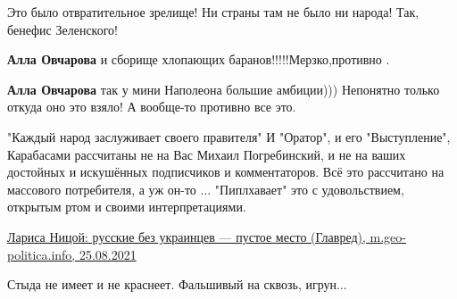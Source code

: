 \begin{itemize}
Это было отвратительное зрелище! Ни страны там не было ни народа! Так, бенефис
Зеленского!

\begin{itemize}
 
\textbf{Алла Овчарова} и сборище хлопающих баранов!!!!!Мерзко,противно
.

 
\textbf{Алла Овчарова} так у мини Наполеона большие амбиции)))
Непонятно только откуда оно это взяло!
А вообще-то противно все это.
\end{itemize}

 
"Каждый народ заслуживает своего правителя"
И "Оратор", и его "Выступление", Карабасами рассчитаны не на Вас Михаил Погребинский, и не на ваших достойных и искушённых подписчиков и комментаторов.
Всё это рассчитано на массового потребителя, а уж он-то ...
"Пиплхавает" это с удовольствием, открытым ртом и своими интерпретациями.

\href{http://m.geo-politica.info/larisa-nitsoy-russkie-bez-ukraintsev--pustoe-mesto-glavred.html}{%
Лариса Ницой: русские без украинцев — пустое место (Главред), m.geo-politica.info, 25.08.2021%
}

 
Стыда не имеет и не краснеет. Фальшивый на сквозь, игрун...

 

\end{itemize}
